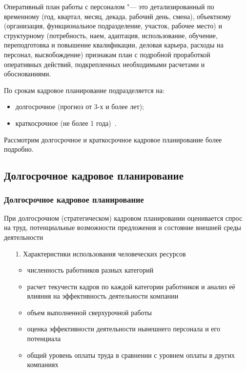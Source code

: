 \documentclass{../industrial-development}
\begin{document}
\lecturenotes

\alert{Оперативный план работы с персоналом} "--- это детализированный по временному (год, квартал, месяц, декада, рабочий день, смена), объектному (организация, функциональное подразделение, участок, рабочее место) и структурному (потребность, наем, адаптация, использование, обучение, переподготовка и повышение квалификации, деловая карьера, расходы на персонал, высвобождение) признакам план с подробной проработкой оперативных действий, подкрепленных необходимыми расчетами и обоснованиями.

По срокам кадровое планирование подразделяется на:
 \begin{itemize}
\item	долгосрочное (прогноз от 3-х и более лет);
\item	краткосрочное (не более 1 года)~\cite[с.~86]{Ivanova}.
 \end{itemize}

Рассмотрим долгосрочное и краткосрочное кадровое планирование более подробно.

\subsection{Долгосрочное кадровое планирование}
\begin{frame} \frametitle{Долгосрочное кадровое планирование}

При долгосрочном (стратегическом) кадровом планировании оценивается спрос на труд, потенциальные возможности предложения и состояние внешней среды деятельности

	 \begin{itemize}
\item[1.] Характеристики использования человеческих ресурсов
  \begin{itemize}
	\item	численность работников разных категорий
	\item	расчет текучести кадров по каждой категории работников и анализ её влияния на эффективность деятельности компании
	\item объем выполненной сверхурочной работы
	\item оценка эффективности деятельности нынешнего персонала и его потенциала
	\item	общий уровень оплаты труда в сравнении с уровнем оплаты в других компаниях
  \end{itemize}
  \end{itemize}
\end{frame}
\end{document}
